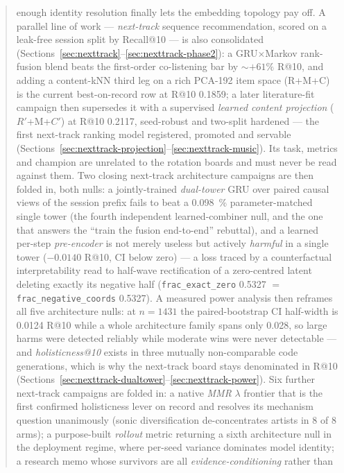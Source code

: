 \documentclass[11pt]{article}
\newcommand{\Rp}{\ensuremath{R'}}
\newcommand{\Cp}{\ensuremath{C'}}
\begin{document}
\begin{abstract}
enough identity resolution finally lets the embedding topology pay off. A parallel line of work --- \emph{next-track} sequence recommendation, scored on a leak-free session split by Recall@10 --- is also consolidated (Sections~\ref{sec:nexttrack}--\ref{sec:nexttrack-phase2}): a GRU$\times$Markov rank-fusion blend beats the first-order co-listening bar by $\sim$$+61\%$ R@10, and adding a content-kNN third leg on a rich PCA-192 item space (R+M+C) is the current best-on-record row at R@10 \num{0.1859}; a later literature-fit campaign then supersedes it with a supervised \emph{learned content projection} (\Rp+M+\Cp) at R@10 \num{0.2117}, seed-robust and two-split hardened --- the first next-track ranking model registered, promoted and servable (Sections~\ref{sec:nexttrack-projection}--\ref{sec:nexttrack-music}). Its task, metrics and champion are unrelated to the rotation boards and must never be read against them. Two closing next-track architecture campaigns are then folded in, both nulls: a jointly-trained \emph{dual-tower} GRU over paired causal views of the session prefix fails to beat a \SI{0.098}{\percent} parameter-matched single tower (the fourth independent learned-combiner null, and the one that answers the ``train the fusion end-to-end'' rebuttal), and a learned per-step \emph{pre-encoder} is not merely useless but actively \emph{harmful} in a single tower ($-\num{0.0140}$ R@10, CI below zero) --- a loss traced by a counterfactual interpretability read to half-wave rectification of a zero-centred latent deleting exactly its negative half (\texttt{frac\_exact\_zero} \num{0.5327} $=$ \texttt{frac\_negative\_coords} \num{0.5327}). A measured power analysis then reframes all five architecture nulls: at $n=\num{1431}$ the paired-bootstrap CI half-width is \num{0.0124} R@10 while a whole architecture family spans only \num{0.028}, so large harms were detected reliably while moderate wins were never detectable --- and \emph{holisticness@10} exists in three mutually non-comparable code generations, which is why the next-track board stays denominated in R@10 (Sections~\ref{sec:nexttrack-dualtower}--\ref{sec:nexttrack-power}).
Six further next-track campaigns are folded in: a native \emph{MMR} $\lambda$
frontier that is the first confirmed holisticness lever on record and resolves its
mechanism question unanimously (sonic diversification de-concentrates artists in 8
of 8 arms); a purpose-built \emph{rollout} metric returning a sixth architecture
null in the deployment regime, where per-seed variance dominates model identity; a
research memo whose survivors are all \emph{evidence-conditioning} rather than
$$
\end{abstract}
\end{document}
